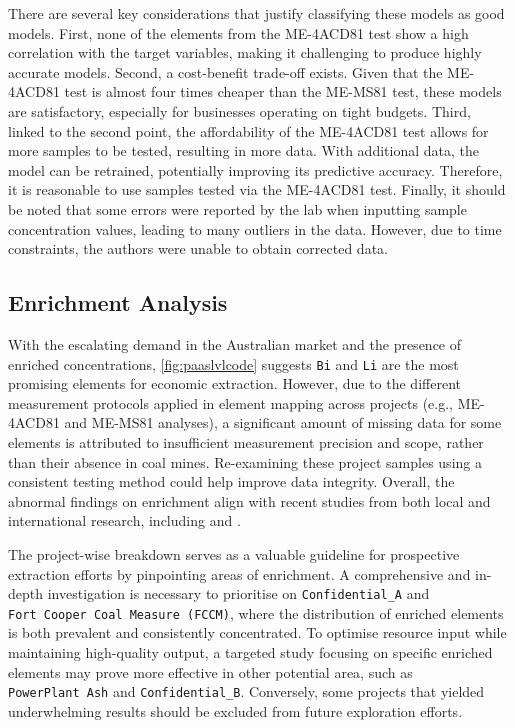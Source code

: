 \documentclass[11pt,a4paper,]{article}
\begin{document}
There are several key considerations that justify classifying these models as good models. First, none of the elements from the ME-4ACD81 test show a high correlation with the target variables, making it challenging to produce highly accurate models. Second, a cost-benefit trade-off exists. Given that the ME-4ACD81 test is almost four times cheaper than the ME-MS81 test, these models are satisfactory, especially for businesses operating on tight budgets. Third, linked to the second point, the affordability of the ME-4ACD81 test allows for more samples to be tested, resulting in more data. With additional data, the model can be retrained, potentially improving its predictive accuracy. Therefore, it is reasonable to use samples tested via the ME-4ACD81 test. Finally, it should be noted that some errors were reported by the lab when inputting sample concentration values, leading to many outliers in the data. However, due to time constraints, the authors were unable to obtain corrected data.

\subsection{Enrichment Analysis}\label{enrichment-analysis-2}

With the escalating demand in the Australian market and the presence of enriched concentrations, \ref{fig:paaslvlcode} suggests \texttt{Bi} and \texttt{Li} are the most promising elements for economic extraction. However, due to the different measurement protocols applied in element mapping across projects (e.g., ME-4ACD81 and ME-MS81 analyses), a significant amount of missing data for some elements is attributed to insufficient measurement precision and scope, rather than their absence in coal mines. Re-examining these project samples using a consistent testing method could help improve data integrity. Overall, the abnormal findings on enrichment align with recent studies from both local and international research, including \autocite{Sun2010} and \autocite{Hodgkinson2020}.

The project-wise breakdown serves as a valuable guideline for prospective extraction efforts by pinpointing areas of enrichment. A comprehensive and in-depth investigation is necessary to prioritise on \texttt{Confidential\_A} and \texttt{Fort\ Cooper\ Coal\ Measure\ (FCCM)}, where the distribution of enriched elements is both prevalent and consistently concentrated. To optimise resource input while maintaining high-quality output, a targeted study focusing on specific enriched elements may prove more effective in other potential area, such as \texttt{PowerPlant\ Ash} and \texttt{Confidential\_B}. Conversely, some projects that yielded underwhelming results should be excluded from future exploration efforts.
\end{document}
